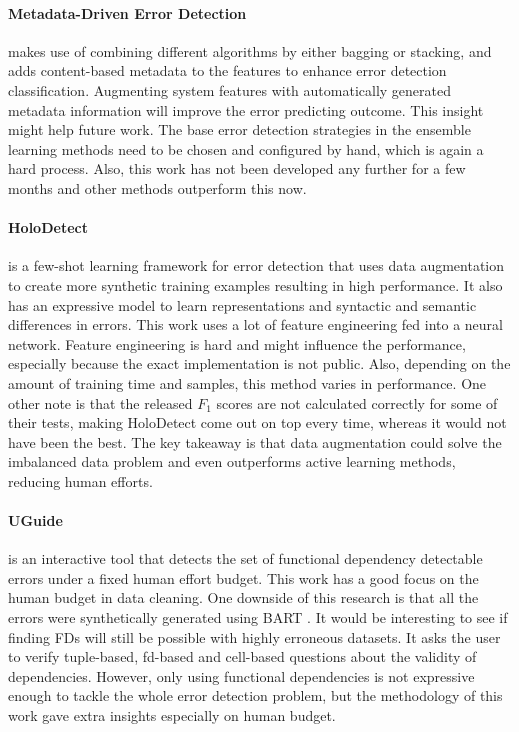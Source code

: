 \paragraph{Metadata-Driven Error Detection \cite{Visengeriyeva2018-qz}} makes use of combining different algorithms by either bagging or stacking, and adds content-based metadata to the features to enhance error detection classification. Augmenting system features with automatically generated metadata information will improve the error predicting outcome. This insight might help future work. The base error detection strategies in the ensemble learning methods need to be chosen and configured by hand, which is again a hard process. Also, this work has not been developed any further for a few months and other methods outperform this now.

\paragraph{HoloDetect \cite{Heidari2019-ox}} is a few-shot learning framework for error detection that uses data augmentation to create more synthetic training examples resulting in high performance. It also has an expressive model to learn representations and syntactic and semantic differences in errors. This work uses a lot of feature engineering fed into a neural network. Feature engineering is hard and might influence the performance, especially because the exact implementation is not public. Also, depending on the amount of training time and samples, this method varies in performance. One other note is that the released $F_1$ scores are not calculated correctly for some of their tests, making HoloDetect come out on top every time, whereas it would not have been the best. The key takeaway is that data augmentation could solve the imbalanced data problem and even outperforms active learning methods, reducing human efforts. 

\paragraph{UGuide \cite{Thirumuruganathan2017-ip}} is an interactive tool that detects the set of functional dependency detectable errors under a fixed human effort budget. This work has a good focus on the human budget in data cleaning. One downside of this research is that all the errors were synthetically generated using BART \cite{Arocena2015-om}. It would be interesting to see if finding FDs will still be possible with highly erroneous datasets. It asks the user to verify tuple-based, fd-based and cell-based questions about the validity of dependencies. However, only using functional dependencies is not expressive enough to tackle the whole error detection problem, but the methodology of this work gave extra insights especially on human budget.


